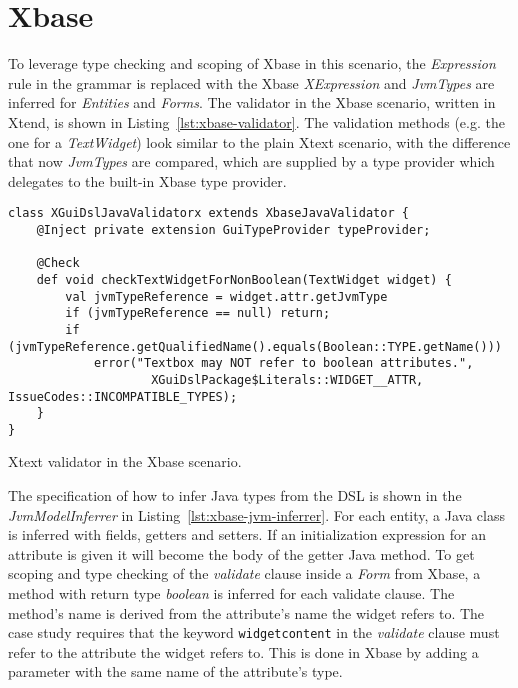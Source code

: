 \section{Xbase}
\label{sec:xbase}

To leverage type checking and scoping of Xbase in this scenario, the
\emph{Expression} rule in the grammar is replaced with the Xbase
\emph{XExpression} and \emph{JvmTypes} are inferred for \emph{Entities} and
\emph{Forms}.
The validator in the Xbase scenario, written in Xtend, is shown in
Listing~\ref{lst:xbase-validator}. The validation methods (e.g. the one for a
\emph{TextWidget}) look similar to the plain Xtext scenario, with the difference
that now \emph{JvmTypes} are compared, which are supplied by a type provider
which delegates to the built-in Xbase type provider.


\begin{listing}[tb]
\begin{lstlisting}[language=xtend] 
class XGuiDslJavaValidatorx extends XbaseJavaValidator {
	@Inject private extension GuiTypeProvider typeProvider;

	@Check
	def void checkTextWidgetForNonBoolean(TextWidget widget) {
		val jvmTypeReference = widget.attr.getJvmType
		if (jvmTypeReference == null) return;
		if (jvmTypeReference.getQualifiedName().equals(Boolean::TYPE.getName()))
			error("Textbox may NOT refer to boolean attributes.",
					XGuiDslPackage$Literals::WIDGET__ATTR, IssueCodes::INCOMPATIBLE_TYPES);
	}
}
\end{lstlisting}
\caption{Xtext validator in the Xbase scenario.}
\label{lst:xbase-validator}
\end{listing}

The specification of how to infer Java types from the DSL is shown in the
\emph{JvmModelInferrer} in Listing~\ref{lst:xbase-jvm-inferrer}.  For each
entity, a Java class is inferred with fields, getters and setters.
If an initialization expression for an attribute is given it will become the
body of the getter Java method.  To get scoping and type checking of the
\emph{validate} clause inside a \emph{Form} from Xbase, a method with return type \emph{boolean} is inferred for
each validate clause. The method's name is derived from the attribute's name the
widget refers to. The case study requires that the keyword \verb|widgetcontent|
in the \emph{validate} clause must refer to the attribute the widget refers to.
This is done in Xbase by adding a parameter with the same name of the
attribute's type. 

